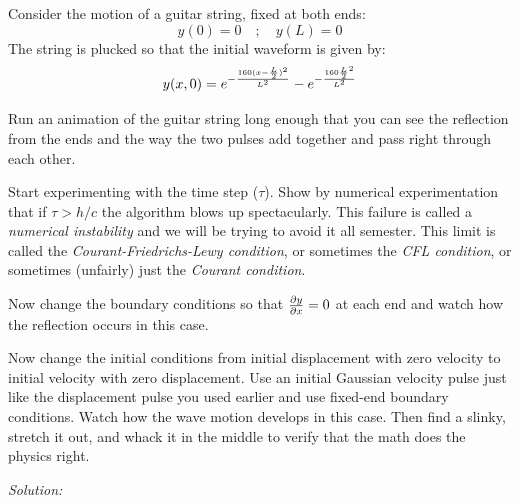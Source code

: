 \clearpage





\begin{enumerate}
\probtwo \label{P:13.3} Consider the motion of a guitar string, fixed
at both ends:
\[
    y(0) = 0 \quad ; \quad y(L) = 0
\]
The string is plucked so that the initial waveform is given by:
\[
y(x,0) = e^{-\frac{160 (x - {L \over 2})^2}{L^2}} - e^{-\frac{160 {L\over 2}^2}{L^2} }
\]
\begin{enumerate}
  \subprob \label{P:13.3a} Run an animation of the guitar string long
  enough that you can see the reflection from the ends and the way the
  two pulses add together and pass right through each other.  

  \subprob Start experimenting with the time step ($\tau$). Show by
  numerical experimentation that if $\tau>h/c$ the algorithm blows up
  spectacularly.      This
  failure is called a {\it numerical instability} and we will be
  trying to avoid it all semester. This limit is called the {\it
    Courant-Friedrichs-Lewy condition}, or sometimes the {\it CFL
    condition}, or sometimes (unfairly) just the {\it Courant
    condition}.  

  \subprob \label{P:13.3b} Now change the boundary conditions so that
  ${\partial y \over \partial x}=0$ at each end and watch how the
  reflection occurs in this case.  

\subprob \label{P:13.3c} Now change the initial
  conditions from initial displacement with zero velocity to initial
  velocity with zero displacement. Use an initial Gaussian velocity
  pulse just like the displacement pulse you used earlier and use
  fixed-end boundary conditions. Watch how the wave motion develops in
  this case. Then find a slinky, stretch it out, and whack it in the
  middle to verify that the math does the physics right.
\end{enumerate}
\end{enumerate}
\ifsolutions
\textit{Solution:}\\

